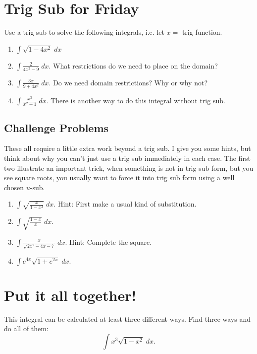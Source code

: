 \documentclass[11pt]{article}  %
\theoremstyle{definition}
\theoremstyle{remark}
\begin{document}
\section{Trig Sub for Friday}
Use a trig sub to solve the following integrals, i.e. let $x =$ trig function.
\begin{enumerate}
\item $\int \sqrt{1-4x^2} \; dx$
\item $\int \tfrac{2}{4x^2-9} \; dx$. What restrictions do we need to place on the domain?
\item $\int \tfrac{3x}{9 + 4x^2} \; dx$. Do we need domain restrictions? Why or why not?
\item $\int \tfrac{x^3}{x^2-1} \; dx$. There is another way to do this integral without trig sub.
\end{enumerate}

\subsection{Challenge Problems}
These all require a little extra work beyond a trig sub. I give you some hints, but think about why you can't just use a trig sub immediately in each case. The first two illustrate an important trick, when something is not in trig sub form, but you see square roots, you usually want to force it into trig sub form using a well chosen $u$-sub.
\begin{enumerate}
\item $\int \sqrt{\tfrac{x}{1-x^3}} \; dx$. Hint: First make a usual kind of substitution.
\item $\int \sqrt{\tfrac{1-x}{x}} \; dx$. 
\item $\int \tfrac{x}{\sqrt{2x^2-4x-7}} \; dx$. Hint: Complete the square.
\item $\int e^{4x} \sqrt{1+e^{2x}} \; dx$.
\end{enumerate}

\section{Put it all together!} This integral can be calculated at least three different ways. Find three ways and do all of them:
\[
\int x^3 \sqrt{1-x^2} \; dx.
\]
\end{document}
